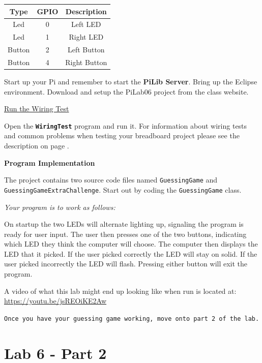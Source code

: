\begin{center}
	\begin{tabular}{c | c | c}
		\hline
		\textbf{Type} & \textbf{GPIO} & \textbf{Description} \\ \hline
		Led & 0 & Left LED \\ 
		\hline
		Led & 1 & Right LED \\ 
		\hline
		Button & 2 & Left Button \\ 
		\hline
		Button & 4 & Right Button \\ 
		\hline	
	\end{tabular}
\end{center}

\vspace{10pt}

Start up your Pi and remember to start the \textbf{PiLib Server}. Bring up the Eclipse environment. Download and setup the PiLab06 project from the class website.

\underline{Run the Wiring Test}

Open the \textbf{\texttt{WiringTest}} program and run it. For information about wiring tests and common problems when testing your breadboard project please see the description on page \pageref{wiringTestDescription}.

\textbf{Program Implementation}

The project contains two source code files named \texttt{GuessingGame} and \texttt{GuessingGameExtraChallenge}. Start out by coding the \texttt{GuessingGame} class.

\textit{Your program is to work as follows:}

On startup the two LEDs will alternate lighting up, signaling the program is ready for user input. The user then presses one of the two buttons, indicating which LED they think the computer will choose. The computer then displays the LED that it picked. If the user picked correctly the LED will stay on solid. If the user picked incorrectly the LED will flash. Pressing either button will exit the program.

A video of what this lab might end up looking like when run is located at: \url{https://youtu.be/jsREOiKE2Aw}

\texttt{Once you have your guessing game working, move onto part 2 of the lab.}

\section{Lab 6 - Part 2}

